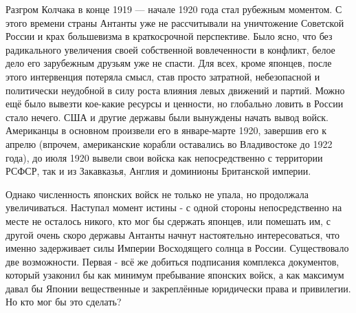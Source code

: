 Разгром Колчака в конце 1919 — начале 1920 года стал рубежным моментом. С этого времени страны Антанты уже не рассчитывали на уничтожение Советской России и крах большевизма в краткосрочной перспективе. Было ясно, что без радикального увеличения своей собственной вовлеченности в конфликт, белое дело его зарубежным друзьям уже не спасти. Для всех, кроме японцев, после этого интервенция потеряла смысл, став просто затратной, небезопасной и политически неудобной в силу роста влияния левых движений и партий. Можно ещё было вывезти кое-какие ресурсы и ценности, но глобально ловить в России стало нечего. США и другие державы были вынуждены начать вывод войск. Американцы в основном произвели его в январе-марте 1920, завершив его к апрелю (впрочем, американские корабли оставались во Владивостоке до 1922 года), до июля 1920 вывели свои войска как непосредственно с территории РСФСР, так и из Закавказья, Англия и доминионы Британской империи.

Однако численность японских войск не только не упала, но продолжала увеличиваться. Наступал момент истины - с одной стороны непосредственно на месте не осталось никого, кто мог бы сдержать японцев, или помешать им, с другой очень скоро державы Антанты начнут настоятельно интересоваться, что именно задерживает силы Империи Восходящего солнца в России. Существовало две возможности. Первая - всё же добиться подписания комплекса документов, который узаконил бы как минимум пребывание японских войск, а как максимум давал бы Японии вещественные и закреплённые юридически права и привилегии. Но кто мог бы это сделать?

